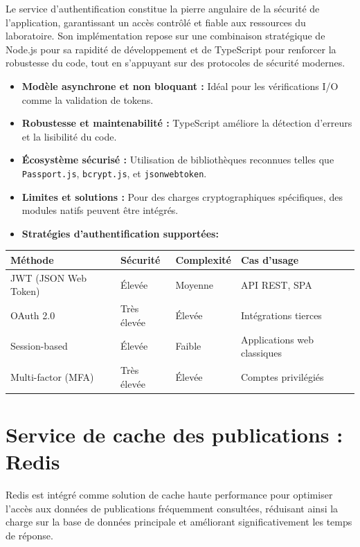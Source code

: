 \documentclass{rapportPfe}
\begin{document}
Le service d'authentification constitue la pierre angulaire de la sécurité de l'application, garantissant un accès contrôlé et fiable aux ressources du laboratoire. Son implémentation repose sur une combinaison stratégique de Node.js pour sa rapidité de développement et de TypeScript pour renforcer la robustesse du code, tout en s'appuyant sur des protocoles de sécurité modernes.

\begin{itemize}
    \item \textbf{Modèle asynchrone et non bloquant :} Idéal pour les vérifications I/O comme la validation de tokens.
    \item \textbf{Robustesse et maintenabilité :} TypeScript améliore la détection d’erreurs et la lisibilité du code.
    \item \textbf{Écosystème sécurisé :} Utilisation de bibliothèques reconnues telles que \texttt{Passport.js}, \texttt{bcrypt.js}, et \texttt{jsonwebtoken}.
    \item \textbf{Limites et solutions :} Pour des charges cryptographiques spécifiques, des modules natifs peuvent être intégrés.
    \item \textbf{Stratégies d'authentification supportées:}
\end{itemize}

\begin{tabular}{| >{\raggedright\arraybackslash}p{4cm} 
                | >{\raggedright\arraybackslash}p{3cm} 
                | >{\raggedright\arraybackslash}p{3cm} 
                | >{\raggedright\arraybackslash}p{5cm} |}
\hline
\textbf{Méthode} & \textbf{Sécurité} & \textbf{Complexité} & \textbf{Cas d'usage} \\
\hline
JWT (JSON Web Token) & Élevée & Moyenne & API REST, SPA \\
\hline
OAuth 2.0 & Très élevée & Élevée & Intégrations tierces \\
\hline
Session-based & Élevée & Faible & Applications web classiques \\
\hline
Multi-factor (MFA) & Très élevée & Élevée & Comptes privilégiés \\
\hline
\end{tabular}

\section{Service de cache des publications : Redis}

Redis est intégré comme solution de cache haute performance pour optimiser l'accès aux données de publications fréquemment consultées, réduisant ainsi la charge sur la base de données principale et améliorant significativement les temps de réponse.
\end{document}
